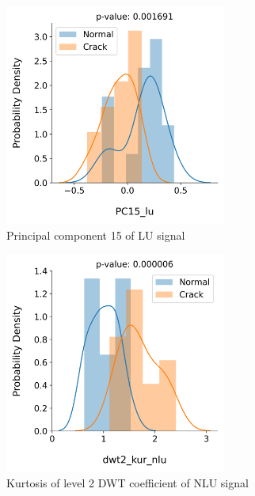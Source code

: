 \begin{figure}[tb]
  \begin{subfigure}[t]{0.49\linewidth}
    \centering
    \includegraphics[width=0.8\textwidth]{fig/crack_detection_PC15_lu.png}
    \caption{Principal component 15 of LU signal}
  \end{subfigure}
  \begin{subfigure}[t]{0.49\linewidth}
    \centering
    \includegraphics[width=0.8\textwidth]{fig/crack_detection_dwt2_kur_nlu.png}
    \caption{Kurtosis of level 2 DWT coefficient of NLU signal}
  \end{subfigure}
  \begin{subfigure}[t]{0.49\linewidth}

\end{subfigure}
\end{figure}
